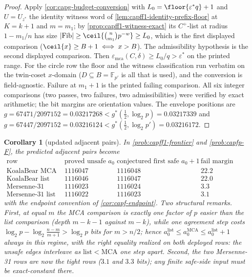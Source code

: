 \documentclass[11pt]{article}
\newtheorem{corollary}[corollary]{Corollary}
\theoremstyle{definition}
\theoremstyle{remark}
\newcommand{\F}{\mathbb{F}}
\newcommand{\B}{B}
\newcommand{\emca}{\varepsilon_{\mathrm{mca}}}
\begin{document}
\begin{proof}
Apply \cref{cor:capg-budget-conversion} with
$L_0=\floor{\varepsilon^{*}q}+1$ and $U=U_{z^{*}}$ the identity witness
word of \cref{lem:capff1-identity-prefix-floor} at $K=k+1$ and $m=m_1$;
by \cref{prop:capff1-witness-exact} its $C^{+}$-list at radius $1-m_1/n$
has size $|\mathrm{Fib}|\ge\ceil{\binom n{m_1}p^{-w}}\ge L_0$, which is
the first displayed comparison ($\ceil{x}\ge B+1\iff x>B$).  The
admissibility hypothesis is the second displayed comparison.  Then
$\emca(C,\delta)\ge L_0/q>\varepsilon^{*}$ on the printed range.  For the
circle row the floor and the witness classification run verbatim on the
twin-coset $x$-domain ($D\subseteq\B=\F_{p'}$ is all that is used), and
the conversion is field-agnostic.  Failure at $m_1+1$ is the printed
failing comparison.  All six integer comparisons (two passes, two
failures, two admissibilities) were verified by exact arithmetic; the bit
margins are orientation values.  The envelope positions are
$g=67471/2097152=0.03217268<g^{*}(\tfrac12,\log_2p)=0.03217339$ and
$g=67447/2097152=0.03216124<g^{*}(\tfrac12,\log_2p')=0.03216172$.
\end{proof}

\begin{corollary}[updated adjacent pairs]\label{cor:capg-adjacent-pairs}
In \cref{prob:capff1-frontier} and \cref{prob:capfp-F}, the predicted
adjacent pairs become
\[
\begin{array}{c|cc|c}
\text{row} & \text{proved unsafe }a_0 & \text{conjectured first safe }a_0+1
& \text{fail margin (bits)}\\ \hline
\text{KoalaBear MCA} & 1116047 & 1116048 & 22.2\\
\text{KoalaBear list} & 1116046 & 1116047 & 22.0\\
\text{Mersenne-31 MCA} & 1116023 & 1116024 & 3.3\\
\text{Mersenne-31 list} & 1116022 & 1116023 & 3.1
\end{array}
\]
with the endpoint convention of \cref{cor:capf-endpoint}.  Two structural
remarks.  First, at equal $m$ the MCA comparison is exactly one factor of
$p$ easier than the list comparison (depth $m-k-1$ against $m-k$), while
one agreement step costs $\log_2p-\log_2\frac{n-m}{m+1}>\log_2p$ bits
for $m>n/2$; hence
$a_0^{\mathrm{list}}\le a_0^{\mathrm{MCA}}\le a_0^{\mathrm{list}}+1$
always in this regime, with the right equality realized on both deployed
rows: the unsafe edges interleave as
$\mathrm{list}<\mathrm{MCA}$ one step apart.  Second,
the two Mersenne-31 rows are now the tight rows ($3.1$ and $3.3$ bits);
any finite safe-side input must be exact-constant there.
\end{corollary}
\end{document}
